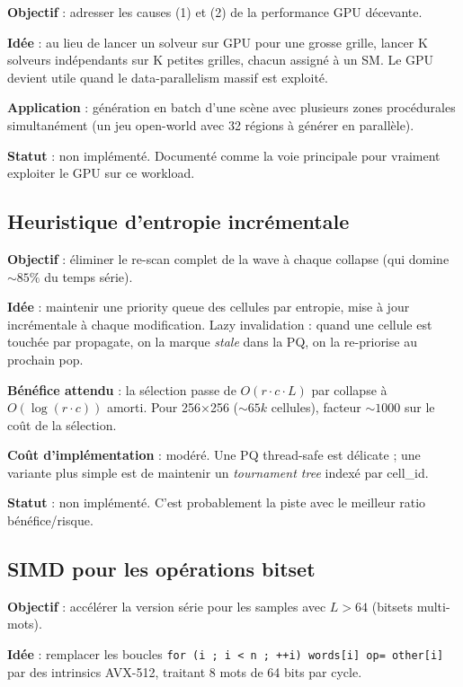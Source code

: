 \textbf{Objectif} : adresser les causes (1) et (2) de la performance GPU décevante.

\textbf{Idée} : au lieu de lancer un solveur sur GPU pour une grosse grille, lancer K solveurs indépendants sur K petites grilles, chacun assigné à un SM. Le GPU devient utile quand le data-parallelism massif est exploité.

\textbf{Application} : génération en batch d'une scène avec plusieurs zones procédurales simultanément (un jeu open-world avec 32 régions à générer en parallèle).

\textbf{Statut} : non implémenté. Documenté comme la voie principale pour vraiment exploiter le GPU sur ce workload.

\subsection{Heuristique d'entropie incrémentale}

\textbf{Objectif} : éliminer le re-scan complet de la wave à chaque collapse (qui domine $\sim 85\%$ du temps série).

\textbf{Idée} : maintenir une priority queue des cellules par entropie, mise à jour incrémentale à chaque modification. Lazy invalidation : quand une cellule est touchée par propagate, on la marque \textit{stale} dans la PQ, on la re-priorise au prochain pop.

\textbf{Bénéfice attendu} : la sélection passe de $O(r \cdot c \cdot L)$ par collapse à $O(\log(r \cdot c))$ amorti. Pour 256×256 ($\sim 65k$ cellules), facteur $\sim 1000$ sur le coût de la sélection.

\textbf{Coût d'implémentation} : modéré. Une PQ thread-safe est délicate ; une variante plus simple est de maintenir un \textit{tournament tree} indexé par cell\_id.

\textbf{Statut} : non implémenté. C'est probablement la piste avec le meilleur ratio bénéfice/risque.

\subsection{SIMD pour les opérations bitset}

\textbf{Objectif} : accélérer la version série pour les samples avec $L > 64$ (bitsets multi-mots).

\textbf{Idée} : remplacer les boucles \texttt{for (i ; i < n ; ++i) words[i] op= other[i]} par des intrinsics AVX-512, traitant 8 mots de 64 bits par cycle.

